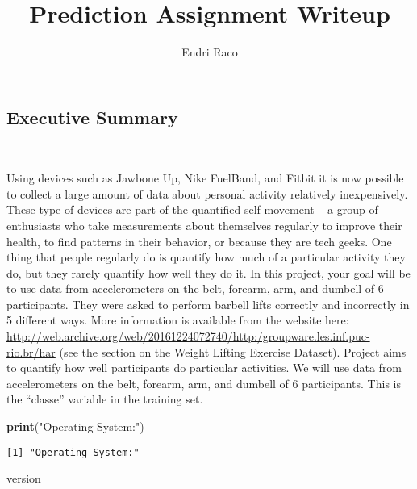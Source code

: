 \documentclass[
  10pt,
  a4paper]{article}
\title{Prediction Assignment Writeup}
\author{Endri Raco}
\date{}
\newenvironment{Shaded}{\begin{snugshade}}{\end{snugshade}}
\newcommand{\KeywordTok}[1]{\textcolor[rgb]{0.13,0.29,0.53}{\textbf{#1}}}
\newcommand{\NormalTok}[1]{#1}
\newcommand{\StringTok}[1]{\textcolor[rgb]{0.31,0.60,0.02}{#1}}
\begin{document}
\maketitle

{
\setcounter{tocdepth}{2}
\tableofcontents
}
\hypertarget{executive-summary}{%
\subsection{Executive Summary}\label{executive-summary}}

~

Using devices such as Jawbone Up, Nike FuelBand, and Fitbit it is now
possible to collect a large amount of data about personal activity
relatively inexpensively. These type of devices are part of the
quantified self movement -- a group of enthusiasts who take measurements
about themselves regularly to improve their health, to find patterns in
their behavior, or because they are tech geeks. One thing that people
regularly do is quantify how much of a particular activity they do, but
they rarely quantify how well they do it. In this project, your goal
will be to use data from accelerometers on the belt, forearm, arm, and
dumbell of 6 participants. They were asked to perform barbell lifts
correctly and incorrectly in 5 different ways. More information is
available from the website here:
\url{http://web.archive.org/web/20161224072740/http:/groupware.les.inf.puc-rio.br/har}
(see the section on the Weight Lifting Exercise Dataset). Project aims
to quantify how well participants do particular activities. We will use
data from accelerometers on the belt, forearm, arm, and dumbell of 6
participants. This is the ``classe'' variable in the training set.

\begin{Shaded}
\begin{Highlighting}[]
\KeywordTok{print}\NormalTok{(}\StringTok{"Operating System:"}\NormalTok{)}
\end{Highlighting}
\end{Shaded}

\begin{verbatim}
[1] "Operating System:"
\end{verbatim}

\begin{Shaded}
\begin{Highlighting}[]
\NormalTok{version}
\end{Highlighting}
\end{Shaded}
\end{document}
